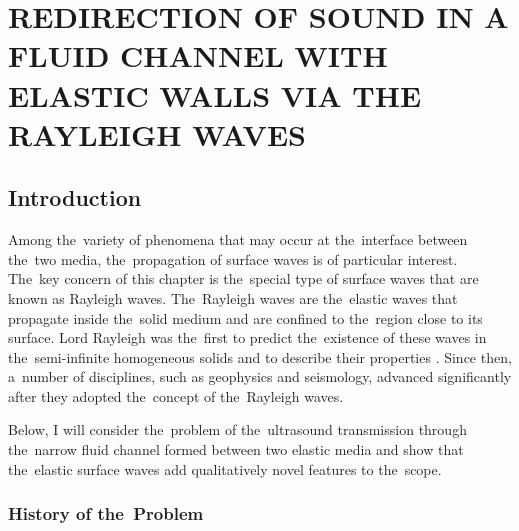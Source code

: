 \chapter{REDIRECTION OF SOUND IN A FLUID CHANNEL WITH ELASTIC WALLS VIA THE RAYLEIGH WAVES}


\section{Introduction}

Among the~variety of phenomena that may occur at the~interface between the~two media, the~propagation of surface waves is of particular interest.
The~key concern of this chapter is the~special type of surface waves that are known as Rayleigh waves.
The~Rayleigh waves are the~elastic waves that propagate inside the~solid medium and are confined to the~region close to its surface.
Lord Rayleigh was the~first to predict the~existence of these waves in the~semi-infinite homogeneous solids and to describe their properties \cite{rayleigh}.
Since then, a~number of disciplines, such as geophysics and seismology, advanced significantly after they adopted the~concept of the~Rayleigh waves.

Below, I will consider the~problem of the~ultrasound transmission through the~narrow fluid channel formed between two elastic media and show that the~elastic surface waves add qualitatively novel features to the~scope.


\subsection{History of the~Problem}

